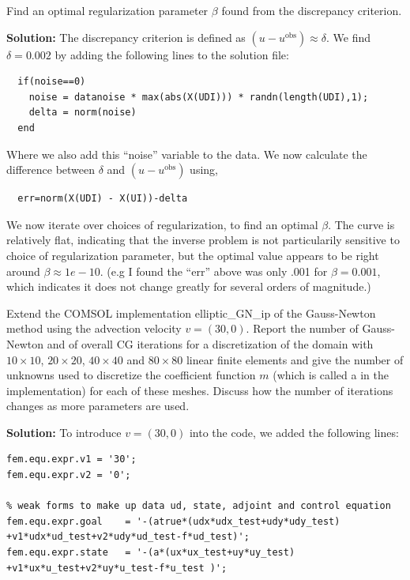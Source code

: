 \documentclass[11pt]{article}
\newenvironment{solution}{\begin{trivlist}\item[]{\bf Solution:}}
                      {\end{trivlist}}
\begin{document}
\begin{enumerate}
\item[(a)]Find an optimal regularization parameter $\beta$ found from the
	  discrepancy criterion.

\begin{solution}
The discrepancy criterion is defined as $(u-u^{\text{obs}}) \approx
 \delta$. We find $\delta = 0.002$ by adding the following lines to the
 solution file: 
 \begin{lstlisting}
  if(noise==0)
    noise = datanoise * max(abs(X(UDI))) * randn(length(UDI),1);
    delta = norm(noise)
  end
 \end{lstlisting}
 Where we also add this ``noise'' variable to the data. We now calculate
 the difference between $\delta$ and $(u-u^{\text{obs}})$ using, 
 \begin{lstlisting}
  err=norm(X(UDI) - X(UI))-delta
 \end{lstlisting}
We now iterate over choices of regularization, to find an optimal
 $\beta$. The curve is relatively flat, indicating that the inverse
 problem is not particularily sensitive to choice of regularization
 parameter, but the optimal value appears to be right around $\beta
 \approx 1e-10$. (e.g I found the ``err'' above was only .001 for $\beta
 = 0.001$, which indicates it does not change greatly for several orders
 of magnitude.)
 
\end{solution}


\item[(b)]Extend the COMSOL implementation elliptic\_GN\_ip of the
	  Gauss-Newton method using the advection velocity
	  $v=(30,0)$. Report the number of Gauss-Newton and of overall
	  CG iterations for a discretization of the domain with $10
	  \times 10$, $20 \times 20$, $40 \times 40$ and $80 \times 80$
	  linear finite elements and give the number of unknowns used to
	  discretize the coefficient function $m$ (which is called a in
	  the implementation) for each of these meshes. Discuss how the
	  number of iterations changes as more parameters are used. 

\begin{solution}
To introduce $v=(30,0)$ into the code, we added the following lines:
\begin{lstlisting}
fem.equ.expr.v1 = '30';
fem.equ.expr.v2 = '0';

% weak forms to make up data ud, state, adjoint and control equation
fem.equ.expr.goal    = '-(atrue*(udx*udx_test+udy*udy_test)
+v1*udx*ud_test+v2*udy*ud_test-f*ud_test)';
fem.equ.expr.state   = '-(a*(ux*ux_test+uy*uy_test)
+v1*ux*u_test+v2*uy*u_test-f*u_test )';


\end{lstlisting}
\end{solution}
\end{enumerate}
\end{document}
